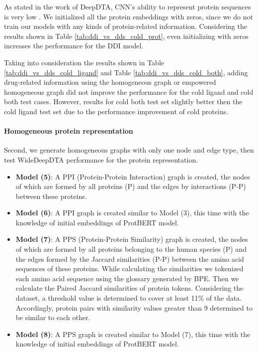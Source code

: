 


As stated in the work of DeepDTA, CNN's ability to represent protein sequences is very low \cite{ozturk2018deepdta}. We initialized all the protein embeddings with zeros, since we do not train our models with any kinds of protein-related information. Considering the results shown in Table \ref{tab:ddi_vs_dds_cold_prot}, even initializing with zeros increases the performance for the DDI model. 




Taking into consideration the results shown in Table \ref{tab:ddi_vs_dds_cold_ligand} and Table \ref{tab:ddi_vs_dds_cold_both}, adding drug-related information using the homogeneous graph or empowered homogeneous graph did not improve the performance for the cold ligand and cold both test cases. However, results for cold both test set slightly better then the cold ligand test set due to the performance improvement of cold proteins. 




\paragraph{Homogeneous protein representation}
Second, we generate homogeneous graphs with only one node and edge type, then test WideDeepDTA performance for the protein representation.

\begin{itemize}
    \item \textbf{Model (5)}: A PPI (Protein-Protein Interaction) graph is created, the nodes of which are formed by all proteins (P) and the edges by interactions (P-P) between these proteins.   
    \item \textbf{Model (6)}: A PPI graph is created similar to Model (3), this time with the knowledge of initial embeddings of ProtBERT model.
    \item \textbf{Model (7)}: A PPS (Protein-Protein Similarity) graph is created, the nodes of which are formed by all proteins belonging to the human species (P) and the edges formed by the Jaccard similarities (P-P) between the amino acid sequences of these proteins. While calculating the similarities we tokenized each amino acid sequence using the glossary generated by BPE. Then we calculate the Paired Jaccard similarities of protein tokens. Considering the dataset, a threshold value is determined to cover at least 11\% of the data. Accordingly, protein pairs with similarity values greater than 9 determined to be similar to each other. 
    \item \textbf{Model (8)}: A PPS graph is created similar to Model (7), this time with the knowledge of initial embeddings of ProtBERT model.
\end{itemize}

